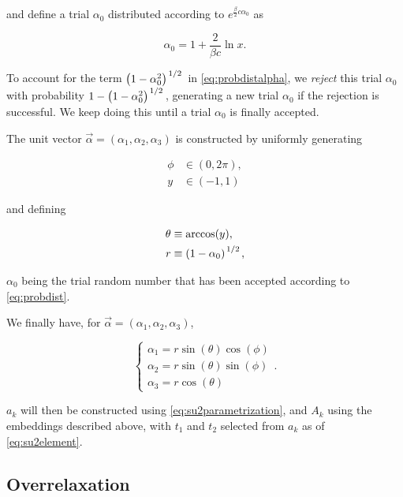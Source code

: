 \documentclass[reqno,12pt]{article}
\numberwithin{equation}{section}
\begin{document}
and define a trial $\alpha_0$ distributed according to $e^{\frac{\beta}{2}c\alpha_0}$ as

\begin{equation}
	\alpha_0 = 1 + \frac{2}{\beta c}\ln{x}.
\end{equation}

To account for the term $\qty(1 - \alpha_0^2)^{\flatfrac{1}{2}}$ in \eqref{eq:probdistalpha}, we \textit{reject} this trial
$\alpha_0$ with probability $1 - \qty(1 - \alpha_0^2)^{\flatfrac{1}{2}}$, generating a new trial $\alpha_0$ if 
the rejection is successful. We keep doing this until a trial $\alpha_0$ is finally accepted. 

The unit vector $\vec{\alpha} = (\alpha_1, \alpha_2, \alpha_3)$ is constructed by uniformly generating 

\begin{equation}
	\begin{aligned}
		\phi &\in (0, 2\pi), \\
		y &\in (-1, 1)
	\end{aligned}
\end{equation}

and defining 

\begin{equation}
	\begin{aligned}
		\theta &\equiv \arccos(y), \\
		r &\equiv \qty(1 - \alpha_0)^{\flatfrac{1}{2}},
	\end{aligned}
\end{equation}

$\alpha_0$ being the trial random number that has been accepted according to \eqref{eq:probdist}. 

We finally have, for $\vec{\alpha} = (\alpha_1, \alpha_2, \alpha_3)$,

\begin{equation}
	\begin{cases}
		\alpha_1 = r \sin(\theta) \cos(\phi) \\
		\alpha_2 = r \sin(\theta) \sin(\phi) \\
		\alpha_3 = r \cos(\theta)
	\end{cases}.
\end{equation}

$a_k$ will then be constructed using \eqref{eq:su2parametrization}, and $A_k$ using the embeddings described
above, with $t_1$ and $t_2$ selected from $a_k$ as of \eqref{eq:su2element}.

\subsection{Overrelaxation}
\end{document}
